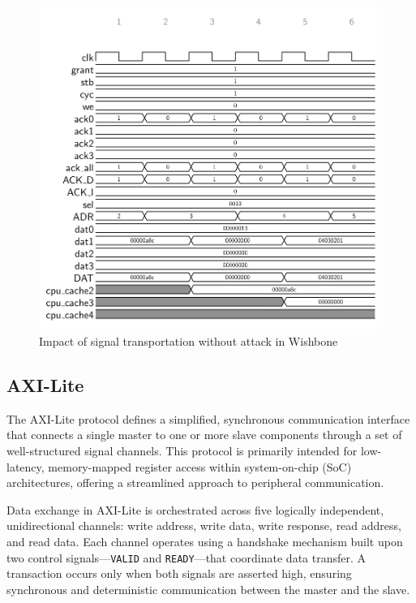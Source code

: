 \begin{figure}[t!]
  \centering
  \includegraphics[width=\linewidth]{Chapitre3/figures/nofault.png}
  \caption{Impact of signal transportation without attack in Wishbone}
  \label{nofault}
\end{figure}

\subsection{AXI-Lite}
The AXI-Lite protocol defines a simplified, synchronous communication interface that connects a single master to one or more slave components through a set of well-structured signal channels. This protocol is primarily intended for low-latency, memory-mapped register access within system-on-chip (SoC) architectures, offering a streamlined approach to peripheral communication.

Data exchange in AXI-Lite is orchestrated across five logically independent, unidirectional channels: write address, write data, write response, read address, and read data. Each channel operates using a handshake mechanism built upon two control signals—\texttt{VALID} and \texttt{READY}—that coordinate data transfer. A transaction occurs only when both signals are asserted high, ensuring synchronous and deterministic communication between the master and the slave.

